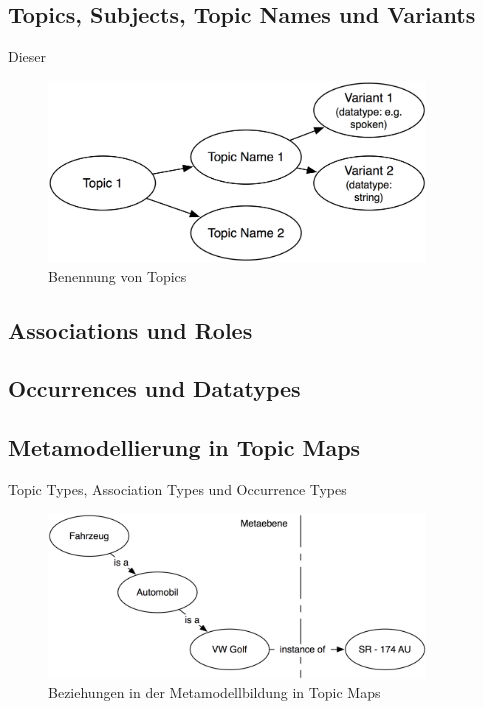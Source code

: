 \subsection{Topics, Subjects, Topic Names und Variants} %
\label{sub:topics_subjects_topic_names_und_variants}

Dieser

\begin{figure}[htbp]
	\centering
		\includegraphics[width=10cm]{img/Persistenz/TopicNaming.png}
	\caption{Benennung von Topics}
	\label{fig:img_Persistenz_TopicNaming}
\end{figure}



\subsection{Associations und Roles} %
\label{sub:associations_und_roles}


\subsection{Occurrences und Datatypes} %
\label{sub:occurrences_und_datatypes}


\subsection{Metamodellierung in Topic Maps} %
\label{sub:metamodellierung_in_topic_maps}

Topic Types, Association Types und Occurrence Types

\begin{figure}[htbp]
	\centering
		\includegraphics[width=10cm]{img/Persistenz/MetaModelExample.png}
	\caption{Beziehungen in der Metamodellbildung in Topic Maps}
	\label{fig:img_Persistenz_MetaModelExample}
\end{figure}

